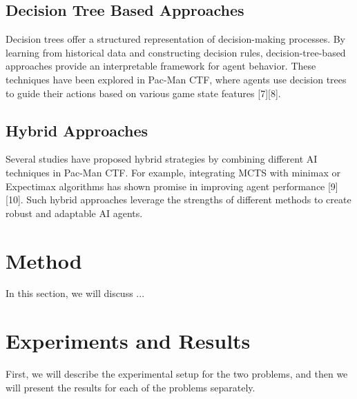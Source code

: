 \documentclass[a4paper,12pt]{article}
\begin{document}
\subsection{Decision Tree Based Approaches}
\label{subsec:decision_tree}
Decision trees offer a structured representation of decision-making processes. By learning from historical data and constructing decision rules, decision-tree-based approaches provide an interpretable framework for agent behavior. These techniques have been explored in Pac-Man CTF, where agents use decision trees to guide their actions based on various game state features [7][8].

\subsection{Hybrid Approaches}
\label{subsec:hybrid}
Several studies have proposed hybrid strategies by combining different AI techniques in Pac-Man CTF. For example, integrating MCTS with minimax or Expectimax algorithms has shown promise in improving agent performance [9][10]. Such hybrid approaches leverage the strengths of different methods to create robust and adaptable AI agents.



\section{Method}
\label{method}

In this section, we will discuss ...





\section{Experiments and Results}
\label{sec:experiments_and_results}

First, we will describe the experimental setup for the two problems, and then we will present the results for each of the problems separately.
\end{document}
